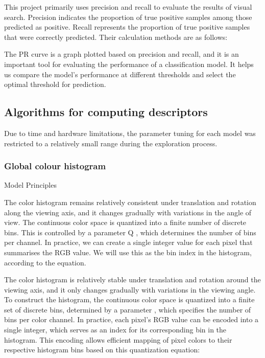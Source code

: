 \documentclass{article}
\begin{document}
This project primarily uses precision and recall to evaluate the results of visual search. Precision indicates the proportion of true positive samples among those predicted as positive. Recall represents the proportion of true positive samples that were correctly predicted. Their calculation methods are as follows:



The PR curve is a graph plotted based on precision and recall, and it is an important tool for evaluating the performance of a classification model. It helps us compare the model’s performance at different thresholds and select the optimal threshold for prediction.

\subsection{Algorithms for computing descriptors}

Due to time and hardware limitations, the parameter tuning for each model was restricted to a relatively small range during the exploration process.

\subsubsection{Global colour histogram}

Model Principles

The color histogram remains relatively consistent under translation and rotation along the viewing axis, and it changes gradually with variations in the angle of view\citep{ComputerVision}. The continuous color space is quantized into a finite number of discrete bins. This is controlled by a parameter Q , which determines the number of bins per channel. In practice, we can create a single integer value for each pixel that summarises the RGB value. We will use this as the bin index in the histogram, according to the equation.



The color histogram is relatively stable under translation and rotation around the viewing axis, and it only changes gradually with variations in the viewing angle. To construct the histogram, the continuous color space is quantized into a finite set of discrete bins, determined by a parameter , which specifies the number of bins per color channel. In practice, each pixel’s RGB value can be encoded into a single integer, which serves as an index for its corresponding bin in the histogram. This encoding allows efficient mapping of pixel colors to their respective histogram bins based on this quantization equation: 
\end{document}
